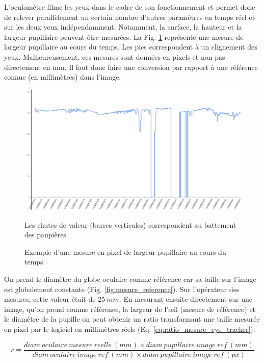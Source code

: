 	\par L'oculomètre filme les yeux dans le cadre de son fonctionnement et permet donc de relever parallèlement un certain nombre d'autres paramètres en temps réel et sur les deux yeux indépendamment. Notamment, la surface, la hauteur et la largeur pupillaire peuvent être mesurées. La Fig. \ref{fig:mesure_pupille} représente une mesure de largeur pupillaire au cours du temps. Les pics correspondent à un clignement des yeux. Malheureusement, ces mesures sont données en pixels et non pas directement en mm. Il faut donc faire une conversion par rapport à une référence connue (en millimètres) dans l'image.
	
	\begin{figure}
		\centering
		\includegraphics[scale=.5]{Figures/LargeurPupillaireEnFonctionDuTemps}
		\caption{Exemple d'une mesure en pixel de largeur pupillaire au cours du temps.}{Les chutes de valeur (barres verticales) correspondent au battement des paupières.}
		\label{fig:mesure_pupille}
	\end{figure}
	
	\par On prend le diamètre du globe oculaire comme référence car sa taille sur l'image est globalement constante (Fig. \ref{fig:mesure_reference}). Sur l'opérateur des mesures, cette valeur était de $25~mm$. En mesurant ensuite directement sur une image, qu'on prend comme référence, la largeur de l'œil (mesure de référence) et le diamètre de la pupille on peut obtenir un ratio transformant une taille mesurée en pixel par le logiciel en millimètres réels (Eq. \ref{eq:ratio_mesure_eye_tracker}).
	
	\begin{equation}
		r = \frac{diam~oculaire~mesure~reelle~(mm) \times diam~pupillaire~image~ref~(mm)}{diam~oculaire~image~ref~(mm) \times diam~pupillaire~image~ref~(px)}
		\label{eq:ratio_mesure_eye_tracker}
	\end{equation}
	
